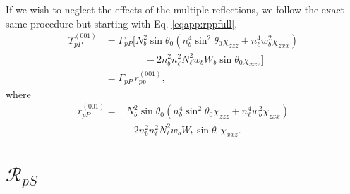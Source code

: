 If we wish to neglect the effects of the multiple reflections, we follow the
exact same procedure but starting with Eq. \eqref{eqapp:rppfull},
\begin{equation*}
\begin{split}
\Upsilon^{(001)}_{pP} &=
\Gamma_{pP}
\big[
N^{2}_{b}\sin\theta_{0}(n^{4}_{b}\sin^{2}\theta_{0}\chi_{zzz}
+ n^{4}_{\ell}w^{2}_{b}\chi_{zxx})\\
&\qquad\qquad- 2n^{2}_{b}n^{2}_{\ell}N^{2}_{\ell}w_{b}W_{b}\sin\theta_{0}
\chi_{xxz}
\big]\\
&= \Gamma_{pP}\,r^{(001)}_{pp},
\end{split}
\end{equation*}
where
\begin{equation}\label{eqapp:final-rpp.001}
\begin{split}
r^{(001)}_{pP} = 
&N^{2}_{b}\sin\theta_{0}(n^{4}_{b}\sin^{2}\theta_{0}\chi_{zzz}
+ n^{4}_{\ell}w^{2}_{b}\chi_{zxx})\\
&- 2n^{2}_{b}n^{2}_{\ell}N^{2}_{\ell}w_{b}W_{b}\sin\theta_{0}\chi_{xxz}.
\end{split}
\end{equation}




\section{\texorpdfstring{$\mathcal{R}_{pS}$}{RpS}}

